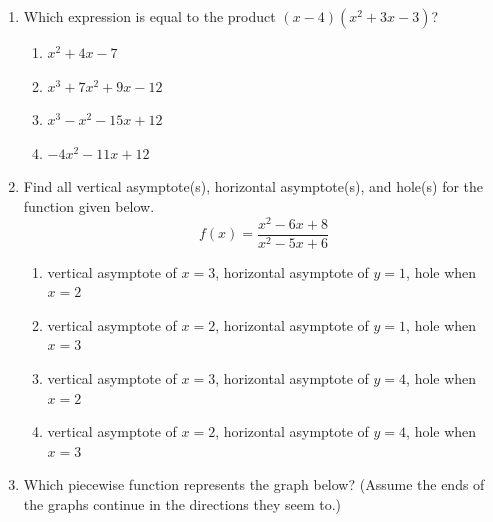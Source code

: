 \documentclass{article}
\begin{document}
\begin{enumerate}
    \item Which expression is equal to the product $(x-4)(x^2+3x-3)$?

            \begin{enumerate}[label=\Alph*)]
                  
                  \item $x^2 + 4x - 7$ %
                  \item $x^3 + 7x^2 + 9x - 12$ %
                  \item $x^3 - x^2 - 15 x + 12$ %
                  \item $-4x^2 - 11x + 12$ %
              \end{enumerate}

    \item Find all vertical asymptote(s), horizontal asymptote(s), and hole(s) for the function given below.
        \[ f(x) = \frac{x^2-6x+8}{x^2-5x+6}
        \]

          \begin{enumerate}[label=\Alph*)]
              
            \item vertical asymptote of $x=3$, horizontal asymptote of $y=1$, hole when $x=2$ %
            \item vertical asymptote of $x=2$, horizontal asymptote of $y=1$, hole when $x=3$
          \item vertical asymptote of $x=3$, horizontal asymptote of $y=4$, hole when $x=2$ 
              \item vertical asymptote of $x=2$, horizontal asymptote of $y=4$, hole when $x=3$
              

          \end{enumerate}




    \item Which piecewise function represents the graph below? (Assume the ends of the graphs continue in the directions they seem to.)


\end{enumerate}
\end{document}
